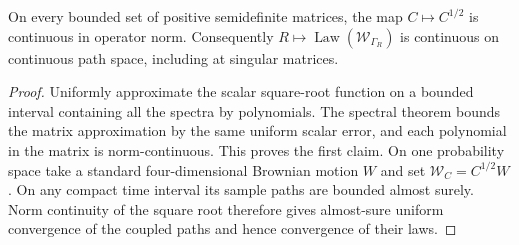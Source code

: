 \begin{lemma}
\label{lem:covariance-square-root}
On every bounded set of positive semidefinite matrices, the map
$C\mapsto C^{1/2}$ is continuous in operator norm. Consequently
$R\mapsto\operatorname{Law}(\mathcal W_{\Gamma_R})$ is continuous on
continuous path space, including at singular matrices.
\end{lemma}
\begin{proof}
Uniformly approximate the scalar square-root function on a bounded
interval containing all the spectra by polynomials. The spectral theorem
bounds the matrix approximation by the same uniform scalar error, and
each polynomial in the matrix is norm-continuous. This proves the first
claim. On one probability space take a standard four-dimensional
Brownian motion $W$ and set $\mathcal W_C=C^{1/2}W$. On any compact time
interval its sample paths are bounded almost surely. Norm continuity
of the square root therefore gives almost-sure uniform convergence of
the coupled paths and hence convergence of their laws.
\end{proof}
